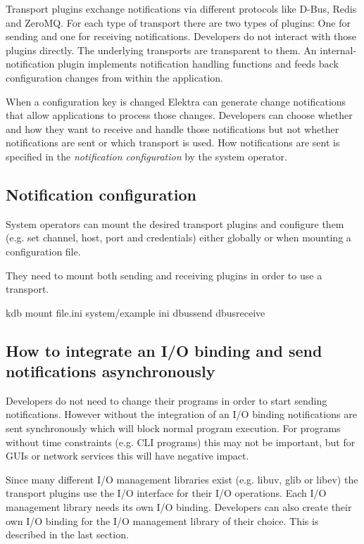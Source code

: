 Transport plugins exchange notifications via different protocols like D-\/\+Bus, Redis and Zero\+MQ. For each type of transport there are two types of plugins\+: One for sending and one for receiving notifications. Developers do not interact with those plugins directly. The underlying transports are transparent to them. An internal-\/notification plugin implements notification handling functions and feeds back configuration changes from within the application.



When a configuration key is changed Elektra can generate change notifications that allow applications to process those changes. Developers can choose whether and how they want to receive and handle those notifications but not whether notifications are sent or which transport is used. How notifications are sent is specified in the {\itshape notification configuration} by the system operator.

\subsection*{Notification configuration}

System operators can mount the desired transport plugins and configure them (e.\+g. set channel, host, port and credentials) either globally or when mounting a configuration file.

They need to mount both sending and receiving plugins in order to use a transport.


\begin{DoxyCode}
kdb mount file.ini system/example ini dbussend dbusreceive
\end{DoxyCode}


\subsection*{How to integrate an I/O binding and send notifications asynchronously}

Developers do not need to change their programs in order to start sending notifications. However without the integration of an I/O binding notifications are sent synchronously which will block normal program execution. For programs without time constraints (e.\+g. C\+LI programs) this may not be important, but for G\+U\+Is or network services this will have negative impact.

Since many different I/O management libraries exist (e.\+g. libuv, glib or libev) the transport plugins use the I/O interface for their I/O operations. Each I/O management library needs its own I/O binding. Developers can also create their own I/O binding for the I/O management library of their choice. This is described in the last section.

